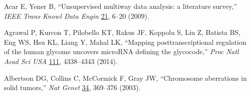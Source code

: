 
Acar E, Yener B, ``Unsupervised multiway data analysis: a literature survey,'' {\em IEEE Trans Knowl Data Engin} \underline{21}, 6--20 (2009).



Agrawal P, Kurcon T, Pilobello KT, Rakus JF, Koppolu S, Liu Z, Batista BS, Eng WS, Hsu KL, Liang Y, Mahal LK, ``Mapping posttranscriptional regulation of the human glycome uncovers microRNA defining the glycocode,'' \emph{Proc Natl Acad Sci USA} \underline{111}, 4338--4343 (2014).



Albertson DG, Collins C, McCormick F, Gray JW, ``Chromosome aberrations in solid tumors,'' \emph{Nat Genet} \underline{34}, 369--376 (2003).
